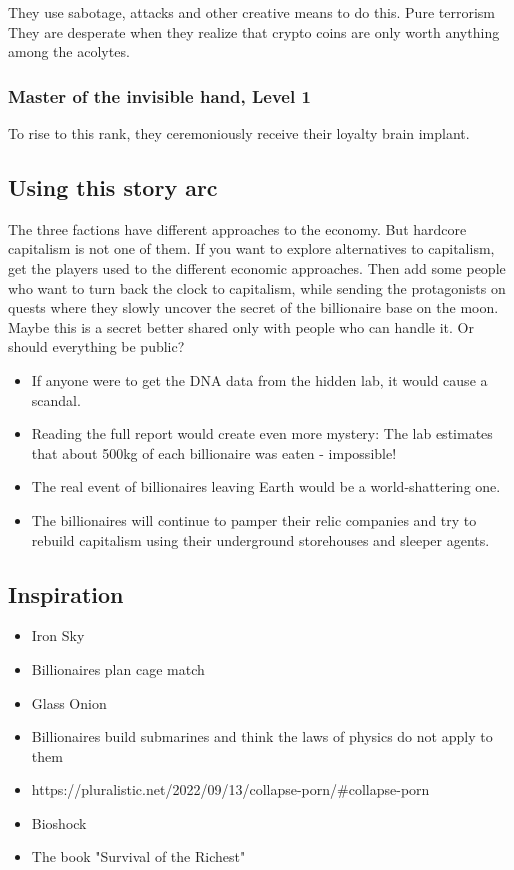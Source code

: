 They use sabotage, attacks and other creative means to do this. Pure terrorism
They are desperate when they realize that crypto coins are only worth anything among the acolytes.

\subsubsection{Master of the invisible hand, Level 1}

To rise to this rank, they ceremoniously receive their loyalty brain implant.


\subsection{Using this story arc}

The three factions have different approaches to the economy. But hardcore capitalism is not one of them. If you want to explore alternatives to capitalism, get the players used to the different economic approaches. Then add some people who want to turn back the clock to capitalism, while sending the protagonists on quests where they slowly uncover the secret of the billionaire base on the moon.
Maybe this is a secret better shared only with people who can handle it. Or should everything be public?

\begin{itemize}
    \item If anyone were to get the DNA data from the hidden lab, it would cause a scandal.
    \item Reading the full report would create even more mystery: The lab estimates that about 500kg of each billionaire was eaten - impossible!
    \item The real event of billionaires leaving Earth would be a world-shattering one.
    \item The billionaires will continue to pamper their relic companies and try to rebuild capitalism using their underground storehouses and sleeper agents.
\end{itemize}


\subsection{Inspiration}

\begin{itemize}
    \item Iron Sky
    \item Billionaires plan cage match
    \item Glass Onion
    \item Billionaires build submarines and think the laws of physics do not apply to them
    \item https://pluralistic.net/2022/09/13/collapse-porn/#collapse-porn
    \item Bioshock
    \item The book "Survival of the Richest"
\end{itemize}

